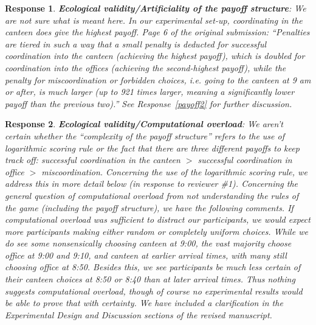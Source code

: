\documentclass[a4paper]{article}
\newtheorem{response}{Response}
\begin{document}
\begin{response}\label{payoff1}
{\bfseries Ecological validity/Artificiality of the payoff structure}: 
We are not sure what is meant here. In our experimental set-up, coordinating in the canteen \emph{does} give the highest payoff. Page 6 of the original submission: ``Penalties are tiered in such a way that a small penalty is deducted for successful coordination into the canteen (achieving the highest payoff), which is doubled for coordination into the offices (achieving the second-highest payoff), while the penalty for miscoordination or forbidden choices, i.e. going to the canteen at 9 am or after, is much larger (up to 921 times larger, meaning a significantly lower payoff than the previous two).'' See Response~\ref{payoff2} for further discussion.
\end{response}
\begin{response}\label{overload1}
{\bfseries Ecological validity/Computational overload}: We aren't certain whether the ``complexity of the payoff structure'' refers to the use of logarithmic scoring rule or the fact that there are three different payoffs to keep track off: successful coordination in the canteen $>$ successful coordination in office $>$ miscoordination. Concerning the use of the logarithmic scoring rule, we address this in more detail below (in response to reviewer \#1). Concerning the general question of computational overload from not understanding the rules of the game (including the payoff structure), we have the following comments. If computational overload was sufficient to distract our participants, we would expect more participants making either random or completely uniform choices. While we do see some nonsensically choosing canteen at 9:00, the vast majority choose office at 9:00 and 9:10, and canteen at earlier arrival times, with many still choosing office at 8:50. Besides this, we see participants be much less certain of their canteen choices at 8:50 or 8:40 than at later arrival times. Thus nothing suggests computational overload, though of course no experimental results would be able to prove that with certainty. We have included a clarification in the Experimental Design and Discussion sections of the revised manuscript.  
 \end{response}
\end{document}
